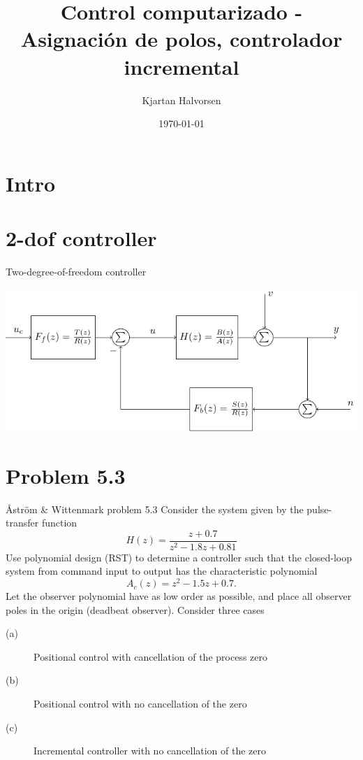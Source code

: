 \documentclass[presentation,aspectratio=169]{beamer}
\author{Kjartan Halvorsen}
\date{\today}
\title{Control computarizado - Asignación de polos, controlador incremental}
\begin{document}
\maketitle

\section{Intro}
\label{sec:orgc764c52}
\section{2-dof controller}
\label{sec:orgd5c46a4}
\begin{frame}[label={sec:orgc2a9e2e}]{Two-degree-of-freedom controller}
\begin{center}
\includegraphics[width=0.8\linewidth]{../../figures/2dof-block-explicit-no-delay}
\end{center}
\end{frame}

\section{Problem 5.3}
\label{sec:org35ffb55}
\begin{frame}[label={sec:org20446f4}]{Åström \& Wittenmark problem 5.3}
Consider the system given by the pulse-transfer function
\[ H(z) = \frac{z+0.7}{z^2 -1.8z + 0.81} \]
Use polynomial design (RST) to determine a controller such that the closed-loop system from command input to output has the characteristic polynomial
\[ A_c(z) = z^2 - 1.5z + 0.7. \]
Let the observer polynomial have as low order as possible, and place all observer poles in the origin (deadbeat observer). Consider three cases
\begin{description}
\item[{(a)}] Positional control with cancellation of the process zero
\item[{(b)}] Positional control with no cancellation of the zero
\item[{(c)}] Incremental controller with  no cancellation of the zero
\end{description}
\end{frame}
\end{document}
